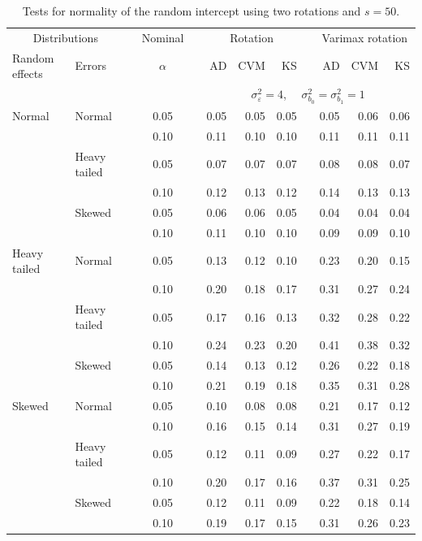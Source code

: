 \documentclass[12pt]{article} %
\begin{document}
\begin{table}[ht]
\caption{Tests for normality of the random intercept using two rotations and $s = 50$.}
\begin{scriptsize}
\begin{center}
\begin{tabular}{ll p{.1cm} c p{.1cm} rrr p{.1cm} rrr}
  \hline
  \multicolumn{2}{c}{Distributions}& & Nominal & &  \multicolumn{3}{c}{Rotation} & & \multicolumn{3}{c}{Varimax rotation} \\ \cline{1-2} \cline{6-8} \cline{10-12}   
  Random effects & Errors & & $\alpha$ & & AD & CVM & KS & & AD & CVM & KS \\ 
   \hline
& && && \multicolumn{7}{c}{$\sigma_{\varepsilon}^2 = 4$, \ \ $\sigma_{b_0}^2 = \sigma_{b_1}^2 = 1$} \\ \cline{6-12}
Normal       & Normal       && 0.05 &&   0.05 & 0.05 & 0.05 && 0.05 & 0.06 & 0.06 \\ 
             &              && 0.10 &&   0.11 & 0.10 & 0.10 && 0.11 & 0.11 & 0.11 \\ 
             & Heavy tailed && 0.05 &&   0.07 & 0.07 & 0.07 && 0.08 & 0.08 & 0.07 \\ 
             &              && 0.10 &&   0.12 & 0.13 & 0.12 && 0.14 & 0.13 & 0.13 \\ 
             & Skewed       && 0.05 &&   0.06 & 0.06 & 0.05 && 0.04 & 0.04 & 0.04 \\ 
             &              && 0.10 &&   0.11 & 0.10 & 0.10 && 0.09 & 0.09 & 0.10 \\ 
Heavy tailed & Normal       && 0.05 &&   0.13 & 0.12 & 0.10 && 0.23 & 0.20 & 0.15 \\ 
             &              && 0.10 &&   0.20 & 0.18 & 0.17 && 0.31 & 0.27 & 0.24 \\ 
             & Heavy tailed && 0.05 &&   0.17 & 0.16 & 0.13 && 0.32 & 0.28 & 0.22 \\ 
             &              && 0.10 &&   0.24 & 0.23 & 0.20 && 0.41 & 0.38 & 0.32 \\ 
             & Skewed       && 0.05 &&   0.14 & 0.13 & 0.12 && 0.26 & 0.22 & 0.18 \\ 
             &              && 0.10 &&   0.21 & 0.19 & 0.18 && 0.35 & 0.31 & 0.28 \\ 
Skewed       & Normal       && 0.05 &&   0.10 & 0.08 & 0.08 && 0.21 & 0.17 & 0.12 \\ 
             &              && 0.10 &&   0.16 & 0.15 & 0.14 && 0.31 & 0.27 & 0.19 \\ 
             & Heavy tailed && 0.05 &&   0.12 & 0.11 & 0.09 && 0.27 & 0.22 & 0.17 \\ 
             &              && 0.10 &&   0.20 & 0.17 & 0.16 && 0.37 & 0.31 & 0.25 \\ 
             & Skewed       && 0.05 &&   0.12 & 0.11 & 0.09 && 0.22 & 0.18 & 0.14 \\ 
             &              && 0.10 &&   0.19 & 0.17 & 0.15 && 0.31 & 0.26 & 0.23 \\ 


\end{tabular}
\end{center}
\end{scriptsize}
\end{table}
\end{document}
